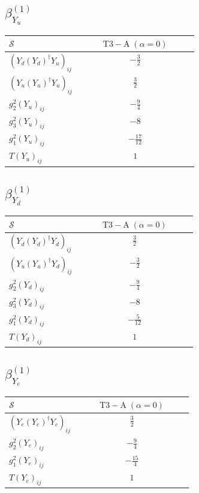 \documentclass[9pt]{article}
\begin{document}
\subsection*{$ \beta_{Y_u}^{(1)} $}
\begin{longtable}{@{}p{0.38\linewidth}c@{}}
\toprule
$\mathcal{S}$ & $ \mathrm{T3-A}\;(\alpha=0) $ \\
\midrule
$ (Y_d (Y_d)^{\dagger} Y_u)_{ij} $ & $ - \frac{3}{2} $ \\
$ (Y_u (Y_u)^{\dagger} Y_u)_{ij} $ & $ \frac{3}{2} $ \\
$ g_2^2 (Y_u)_{ij} $ & $ - \frac{9}{4} $ \\
$ g_3^2 (Y_u)_{ij} $ & $ -8 $ \\
$ g_1^2 (Y_u)_{ij} $ & $ - \frac{17}{12} $ \\
$ T (Y_u)_{ij} $ & $ 1 $ \\
\bottomrule
\end{longtable}
\subsection*{$ \beta_{Y_d}^{(1)} $}
\begin{longtable}{@{}p{0.38\linewidth}c@{}}
\toprule
$\mathcal{S}$ & $ \mathrm{T3-A}\;(\alpha=0) $ \\
\midrule
$ (Y_d (Y_d)^{\dagger} Y_d)_{ij} $ & $ \frac{3}{2} $ \\
$ (Y_u (Y_u)^{\dagger} Y_d)_{ij} $ & $ - \frac{3}{2} $ \\
$ g_2^2 (Y_d)_{ij} $ & $ - \frac{9}{4} $ \\
$ g_3^2 (Y_d)_{ij} $ & $ -8 $ \\
$ g_1^2 (Y_d)_{ij} $ & $ - \frac{5}{12} $ \\
$ T (Y_d)_{ij} $ & $ 1 $ \\
\bottomrule
\end{longtable}
\subsection*{$ \beta_{Y_e}^{(1)} $}
\begin{longtable}{@{}p{0.38\linewidth}c@{}}
\toprule
$\mathcal{S}$ & $ \mathrm{T3-A}\;(\alpha=0) $ \\
\midrule
$ (Y_e (Y_e)^{\dagger} Y_e)_{ij} $ & $ \frac{3}{2} $ \\
$ g_2^2 (Y_e)_{ij} $ & $ - \frac{9}{4} $ \\
$ g_1^2 (Y_e)_{ij} $ & $ - \frac{15}{4} $ \\
$ T (Y_e)_{ij} $ & $ 1 $ \\
\bottomrule
\end{longtable}
\end{document}
